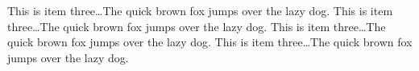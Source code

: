 \documentclass[11pt]{article}%
\begin{document}
\begin{multicols*}{2}
This is item three\dots The quick brown fox jumps
over the lazy dog. This is item three\dots The quick brown fox jumps over the lazy dog. This is item three\dots The quick brown fox jumps over the lazy dog. This is item three\dots The quick brown fox jumps over the lazy dog.

\printbibliography %

\printindex %

\end{multicols*}
\end{document}
